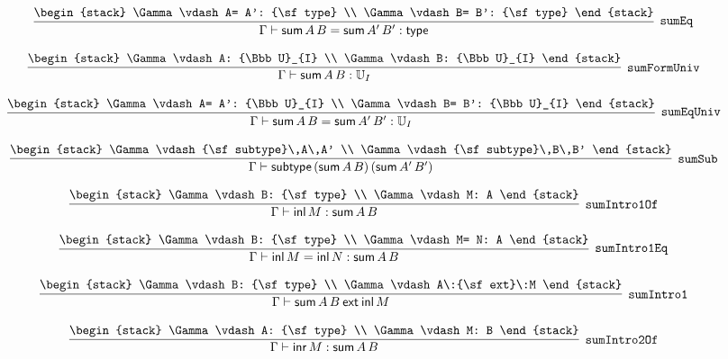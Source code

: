 \[
\infer[{\tt sumEq}]{\Gamma \vdash {\sf sum}\,A\,B= {\sf sum}\,A'\,B': {\sf type}}{
\begin{stack}
\Gamma \vdash A= A': {\sf type}
\\
\Gamma \vdash B= B': {\sf type}
\end{stack}}
\]

\[
\infer[{\tt sumFormUniv}]{\Gamma \vdash {\sf sum}\,A\,B: {\Bbb U}_{I}}{
\begin{stack}
\Gamma \vdash A: {\Bbb U}_{I}
\\
\Gamma \vdash B: {\Bbb U}_{I}
\end{stack}}
\]

\[
\infer[{\tt sumEqUniv}]{\Gamma \vdash {\sf sum}\,A\,B= {\sf sum}\,A'\,B': {\Bbb U}_{I}}{
\begin{stack}
\Gamma \vdash A= A': {\Bbb U}_{I}
\\
\Gamma \vdash B= B': {\Bbb U}_{I}
\end{stack}}
\]

\[
\infer[{\tt sumSub}]{\Gamma \vdash {\sf subtype}\,({\sf sum}\,A\,B)\,({\sf sum}\,A'\,B')}{
\begin{stack}
\Gamma \vdash {\sf subtype}\,A\,A'
\\
\Gamma \vdash {\sf subtype}\,B\,B'
\end{stack}}
\]

\[
\infer[{\tt sumIntro1Of}]{\Gamma \vdash {\sf inl}\,M: {\sf sum}\,A\,B}{
\begin{stack}
\Gamma \vdash B: {\sf type}
\\
\Gamma \vdash M: A
\end{stack}}
\]

\[
\infer[{\tt sumIntro1Eq}]{\Gamma \vdash {\sf inl}\,M= {\sf inl}\,N: {\sf sum}\,A\,B}{
\begin{stack}
\Gamma \vdash B: {\sf type}
\\
\Gamma \vdash M= N: A
\end{stack}}
\]

\[
\infer[{\tt sumIntro1}]{\Gamma \vdash {\sf sum}\,A\,B\:{\sf ext}\:{\sf inl}\,M}{
\begin{stack}
\Gamma \vdash B: {\sf type}
\\
\Gamma \vdash A\:{\sf ext}\:M
\end{stack}}
\]

\[
\infer[{\tt sumIntro2Of}]{\Gamma \vdash {\sf inr}\,M: {\sf sum}\,A\,B}{
\begin{stack}
\Gamma \vdash A: {\sf type}
\\
\Gamma \vdash M: B
\end{stack}}
\]

